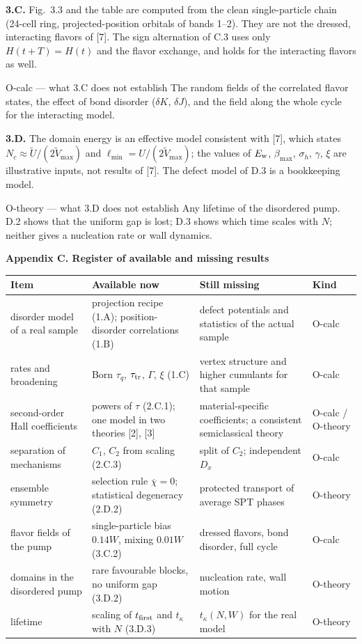 \documentclass[11pt,a4paper]{article}
\newcommand{\avg}[1]{\overline{#1}}
\newcommand{\pagetitle}[1]{{\large\bfseries\color{ink}#1}\par\vspace{4pt}}
\begin{document}
\textbf{3.C.} Fig.\ 3.3 and the table are computed from the clean single-particle chain (24-cell ring, projected-position orbitals of bands 1--2). They are not the dressed, interacting flavors of [7]. The sign alternation of C.3 uses only $H(t+T)=H(t)$ and the flavor exchange, and holds for the interacting flavors as well.
\begin{redbox}{O-calc --- what 3.C does not establish}
The random fields of the correlated flavor states, the effect of bond disorder ($\delta K$, $\delta J$), and the field along the whole cycle for the interacting model.
\end{redbox}
\textbf{3.D.} The domain energy is an effective model consistent with [7], which states $N_c\approx\tilde U/(2\tilde V_{\max})$ and $\ell_{\min}=U/(2\tilde V_{\max})$; the values of $E_{\rm w}$, $\beta_{\max}$, $\sigma_h$, $\gamma$, $\xi$ are illustrative inputs, not results of [7]. The defect model of D.3 is a bookkeeping model.
\begin{redbox}{O-theory --- what 3.D does not establish}
Any lifetime of the disordered pump. D.2 shows that the uniform gap is lost; D.3 shows which time scales with $N$; neither gives a nucleation rate or wall dynamics.
\end{redbox}

\pagetitle{Appendix C. Register of available and missing results}
{\small\begin{tabularx}{\textwidth}{@{}p{42mm}YYp{15mm}@{}}\toprule
Item&Available now&Still missing&Kind\\\midrule
disorder model of a real sample&projection recipe (1.A); position-disorder correlations (1.B)&defect potentials and statistics of the actual sample&O-calc\\
rates and broadening&Born $\tau_q$, $\tau_{\rm tr}$, $\Gamma$, $\xi$ (1.C)&vertex structure and higher cumulants for that sample&O-calc\\
second-order Hall coefficients&powers of $\tau$ (2.C.1); one model in two theories [2], [3]&material-specific coefficients; a consistent semiclassical theory&O-calc / O-theory\\
separation of mechanisms&$C_1$, $C_2$ from scaling (2.C.3)&split of $C_2$; independent $D_x$&O-calc\\
ensemble symmetry&selection rule $\avg\chi=0$; statistical degeneracy (2.D.2)&protected transport of average SPT phases&O-theory\\
flavor fields of the pump&single-particle bias $0.14W$, mixing $0.01W$ (3.C.2)&dressed flavors, bond disorder, full cycle&O-calc\\
domains in the disordered pump&rare favourable blocks, no uniform gap (3.D.2)&nucleation rate, wall motion&O-theory\\
lifetime&scaling of $t_{\rm first}$ and $t_\kappa$ with $N$ (3.D.3)&$t_\kappa(N,W)$ for the real model&O-theory\\
\bottomrule\end{tabularx}}
\end{document}
